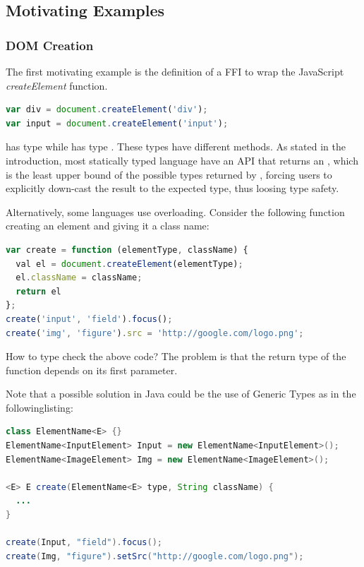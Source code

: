 \documentclass[runningheads,a4paper]{llncs}
\begin{document}

\subsection{Motivating Examples}

\subsubsection{DOM Creation}

The first motivating example is the definition of a FFI to wrap the JavaScript \textit{createElement} function.

\begin{lstlisting}[language=JavaScript]
var div = document.createElement('div');
var input = document.createElement('input');
\end{lstlisting}

 has type  while  has type . These types
have different methods. As stated in the introduction, most statically typed language have an API
that returns an , which is the least upper bound of the possible types returned by
, forcing users to explicitly down-cast the result to the expected type, thus
loosing type safety.

Alternatively, some languages use overloading. Consider the following function creating an element and giving it a class name:

\begin{lstlisting}[language=JavaScript]
var create = function (elementType, className) {
  val el = document.createElement(elementType);
  el.className = className;
  return el
};
create('input', 'field').focus();
create('img', 'figure').src = 'http://google.com/logo.png';
\end{lstlisting}

How to type check the above code? The problem is that the return type of the  function
depends on its first parameter.

Note that a possible solution in Java could be the use of Generic Types as in the followinglisting:

\begin{lstlisting}[language=Java]
class ElementName<E> {}
ElementName<InputElement> Input = new ElementName<InputElement>();
ElementName<ImageElement> Img = new ElementName<ImageElement>();

<E> E create(ElementName<E> type, String className) {
  ...
}

create(Input, "field").focus();
create(Img, "figure").setSrc("http://google.com/logo.png");
\end{lstlisting}
\end{document}
